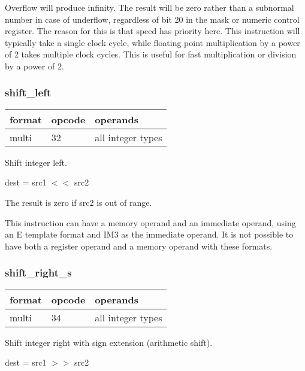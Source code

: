 \documentclass[forwardcom.tex]{subfiles}
\begin{document}
Overflow will produce infinity. The result will be zero rather than a subnormal number in case of underflow, regardless of bit 20 in the mask or numeric control register. 
The reason for this is that
speed has priority here. This instruction will typically take a single clock cycle, while floating point multiplication by a power of 2 takes multiple clock cycles. 
This is useful for fast multiplication or division by a power of 2.


\subsubsection{shift\_left}
\label{table:shiftLeftInstruction}
\begin{tabular}{|p{12mm}|p{12mm}|p{110mm}|}
\hline
\bfseries format & \bfseries opcode & \bfseries operands \\ \hline
multi & 32 & all integer types \\ \hline
\end{tabular}
\vspace{2mm}

Shift integer left.

dest = src1 $<<$ src2
\vspace{2mm}

The result is zero if src2 is out of range.
\vspace{2mm}

This instruction can have a memory operand and an immediate operand, using an E template format and IM3  as the immediate operand. It is not possible to have both a register operand and a memory operand with these formats.
\vspace{2mm}

\subsubsection{shift\_right\_s}
\label{table:shiftRightSInstruction}
\begin{tabular}{|p{12mm}|p{12mm}|p{110mm}|}
\hline
\bfseries format & \bfseries opcode & \bfseries operands \\ \hline
multi & 34 & all integer types \\ \hline
\end{tabular}
\vspace{2mm}

Shift integer right with sign extension (arithmetic shift).

dest = src1 $>>$ src2
\vspace{2mm}
\end{document}
